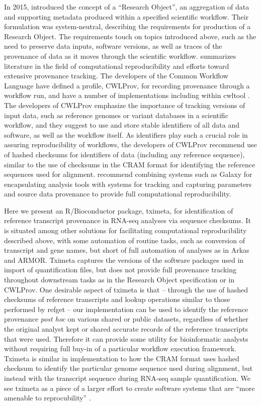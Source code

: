 \documentclass[12pt]{article} \usepackage[utf8]{inputenc}
\begin{document}
In 2015, \citet{Belhajjame2015} introduced the concept of a ``Research
Object'', an aggregation of data and supporting metadata produced
within a specified scientific workflow. Their formulation was
system-neutral, describing the requirements for production of a
Research Object. The requirements touch on topics introduced above,
such as the need to preserve data inputs, software versions, as well
as traces of the provenance of data as it moves through the scientific
workflow. \citet{Belhajjame2015} summarizes literature in the field of
computational reproducibility and efforts toward extensive provenance
tracking. The developers of the Common Workflow Language \citep{cwl}
have defined a profile, CWLProv, for recording provenance through a
workflow run, and have a number of implementations including within
cwltool \citep{Khan2018}. The developers of CWLProv emphasize the
importance of tracking versions of input data, such as reference
genomes or variant databases in a scientific workflow, and they
suggest to use and store stable identifiers of all data and software,
as well as the workflow itself. As identifiers play such a crucial
role in assuring reproducibility of workflows, the developers of
CWLProv recommend use of hashed checksums for identifiers of data
(including any reference sequence), similar to the use of checksums in
the CRAM format for identifying the reference sequences used for
alignment. \citet{Gruning2018} recommend combining systems such as
Galaxy for encapsulating analysis tools with systems for tracking and
capturing parameters and source data provenance to provide full
computational reproducibility.

Here we present an R/Bioconductor package, tximeta, for identification
of reference transcript provenance in RNA-seq analyses via sequence
checksums. It is situated among other solutions for facilitating
computational reproducibility described above, with some automation of
routine tasks, such as conversion of transcript and gene names, but
short of full automation of analyses as in Arkas and ARMOR. Tximeta
captures the versions of the software packages used in import of
quantification files, but does not provide full provenance tracking
throughout downstream tasks as in the Research Object specification or
in CWLProv. One desirable aspect of tximeta is that -- through the use
of hashed checksums of reference transcripts and lookup operations
similar to those performed by refget -- our implementation can be used
to identify the reference provenance \textit{post hoc} on various
shared or public datasets, regardless of whether the original analyst
kept or shared accurate records of the reference transcripts that were
used. Therefore it can provide some utility for bioinformatic analysts
without requiring full buy-in of a particular workflow execution
framework. Tximeta is similar in implementation to how the CRAM format
uses hashed checksum to identify the particular genome sequence used
during alignment, but instead with the transcript sequence during
RNA-seq sample quantification. We see tximeta as a piece of a larger
effort to create software systems that are ``more amenable to
reprocubility'' \citep{Peng2011}.
\end{document}
